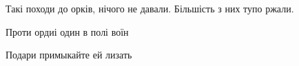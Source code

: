  
 
 
 
 

Такі походи до орків, нічого не давали. Більшість з них тупо ржали.

Проти ордиі один в полі воїн

Подари примыкайте ей лизать

